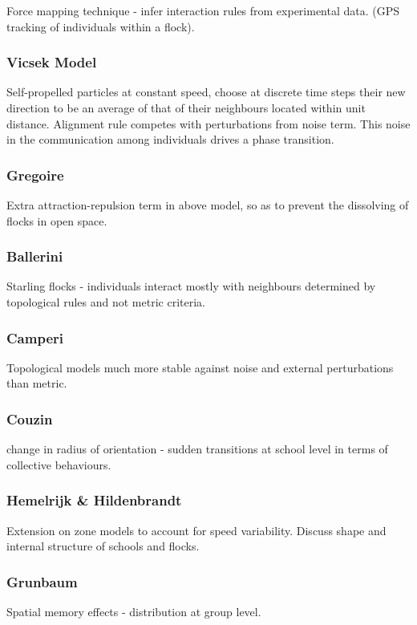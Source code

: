 \documentclass[10pt,twocolumn]{revtex4-2}    %
\begin{document}
Force mapping technique - infer interaction rules from experimental data. (GPS tracking of individuals within a flock).

\subsubsection{Vicsek Model}
Self-propelled particles at constant speed, choose at discrete time steps their new direction to be an average of that of their neighbours located within unit distance. Alignment rule competes with perturbations from noise term. This noise in the communication among individuals drives a phase transition.

\subsubsection{Gregoire}
Extra attraction-repulsion term in above model, so as to prevent the dissolving of flocks in open space.

\subsubsection{Ballerini}
Starling flocks - individuals interact mostly with neighbours determined by topological rules and not metric criteria.

\subsubsection{Camperi} 
Topological models much more stable against noise and external perturbations than metric.

\subsubsection{Couzin}
change in radius of orientation - sudden transitions at school level in terms of collective behaviours. 

\subsubsection{Hemelrijk \& Hildenbrandt}
Extension on zone models to account for speed variability. Discuss shape and internal structure of schools and flocks.

\subsubsection{Grunbaum}
Spatial memory effects - distribution at group level.
\end{document}
